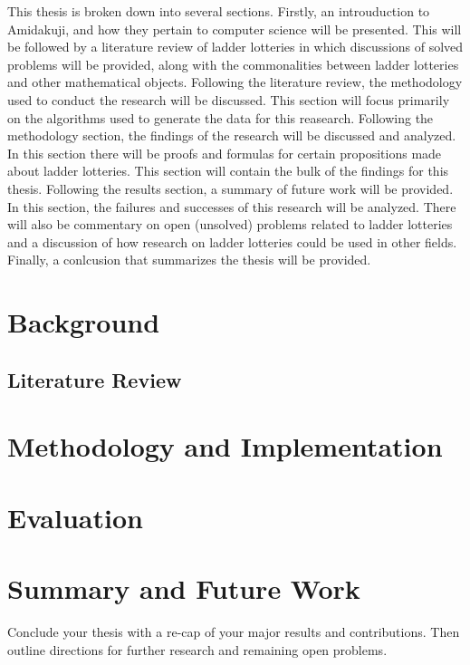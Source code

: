 This thesis is broken down into several sections. Firstly, an introuduction to Amidakuji, 
and how they pertain to computer science will be presented. This will be followed by a literature 
review of ladder lotteries in which discussions of solved problems will be 
provided, along with the commonalities between ladder lotteries and 
other mathematical objects. Following the literature review, the methodology
used to conduct the research will be discussed. This section will focus 
primarily on the algorithms used to generate the data for this reasearch. 
Following the methodology section, the findings of the research will be discussed and analyzed. 
In this section there will be proofs and formulas for certain propositions made about ladder 
lotteries. This section will contain the bulk of the findings for this thesis.
Following the results section, a summary of future work will be provided. In this section,
the failures and successes of this research will be analyzed. There will also be commentary on 
open (unsolved) problems related to ladder lotteries and a 
discussion of how research on ladder lotteries could be used in other fields.
Finally, a conlcusion that summarizes the thesis will be provided.

\chapter{Background}
\label{chapter:background}
 


\section{Literature Review}


\chapter{Methodology and Implementation}  
\label{chapter:methodology}


\chapter{Evaluation}  
\label{chapter:evaluation}



\chapter{Summary and Future Work}
\label{chapter:summary}

Conclude your thesis with a re-cap of your major results and contributions.  Then outline directions for further research and remaining open problems.